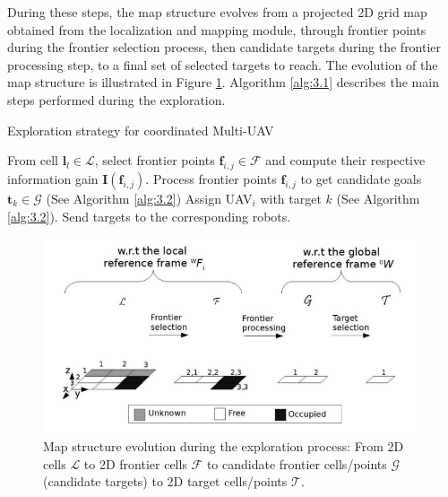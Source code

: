 \documentclass[11pt,openany]{book}
\begin{document}
During these steps, the map structure evolves from a projected 2D grid map obtained from the localization and mapping module, through frontier points during the frontier selection process, then candidate targets during the frontier processing step, to a ﬁnal set of selected targets to reach. The evolution of the map structure is illustrated in Figure \ref{fig:3.2}. Algorithm \ref{alg:3.1} describes the main steps performed during the exploration.
\begin{algorithm}
    \caption{Exploration strategy for coordinated Multi-UAV}
    \label{alg:3.1}
    \begin{algorithmic}[1]
        \STATE From cell $\mathbf{l}_l \in \mathcal{L}$, select frontier points $\mathbf{f}_{i,j} \in \mathcal{F}$ and compute their respective information gain $\mathit{\mathbf{I}}(\mathbf{f}_{i,j})$.
        \STATE Process frontier points $\mathbf{f}_{i,j}$ to get candidate goals $\mathbf{t}_k \in \mathcal{G}$ (See Algorithm \ref{alg:3.2})
        \STATE Assign UAV$_i$ with target $k$ (See Algorithm \ref{alg:3.2}).
        \STATE Send targets to the corresponding robots.
    \end{algorithmic}
\end{algorithm}
\begin{figure}[H]
    \centering
    \includegraphics[scale=0.4]{assets/3_2.png}
    \caption{Map structure evolution during the exploration process: From 2D cells $\mathcal{L}$ to 2D frontier cells $\mathcal{F}$ to candidate frontier cells/points $\mathcal{G}$ (candidate targets) to 2D target cells/points $\mathcal{T}$.}
    \label{fig:3.2}
\end{figure}
\end{document}
